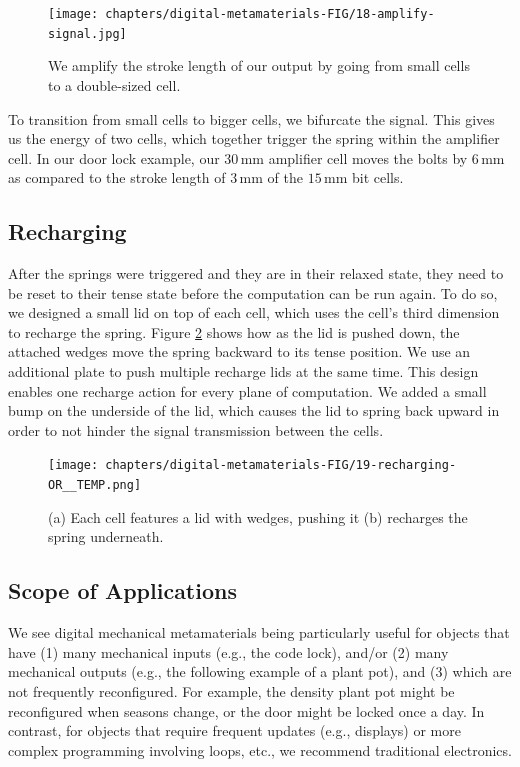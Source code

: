 \begin{figure} [h]  
    \texttt{[image: chapters/digital-metamaterials-FIG/18-amplify-signal.jpg]}
    \caption[Short figure name.]{We amplify the stroke length of our output by going from small cells to a double-sized cell. 
    \label{fig:18-amplify-signal}}
\end{figure}

To transition from small cells to bigger cells, we bifurcate the signal. This gives us the energy of two cells, which together trigger the spring within the amplifier cell. In our door lock example, our $30\, \mathrm{mm}$ amplifier cell moves the bolts by $6\, \mathrm{mm}$ as compared to the stroke length of $3\, \mathrm{mm}$ of the $15\, \mathrm{mm}$ bit cells.


\subsection{Recharging}

After the springs were triggered and they are in their relaxed state, they need to be reset to their tense state before the computation can be run again. To do so, we designed a small lid on top of each cell, which uses the cell's third dimension to recharge the spring. Figure \ref{fig:19-recharging-OR__TEMP} shows how as the lid is pushed down, the attached wedges move the spring backward to its tense position. We use an additional plate to push multiple recharge lids at the same time. This design enables one recharge action for every plane of computation. We added a small bump on the underside of the lid, which causes the lid to spring back upward in order to not hinder the signal transmission between the cells.

\begin{figure} [h]  
    \texttt{[image: chapters/digital-metamaterials-FIG/19-recharging-OR\_\_TEMP.png]}
    \caption[Short figure name.]{(a) Each cell features a lid with wedges, pushing it (b) recharges the spring underneath.
    \label{fig:19-recharging-OR__TEMP}}
\end{figure}


\subsection{Scope of Applications}

We see digital mechanical metamaterials being particularly useful for objects that have (1) many mechanical inputs (e.g., the code lock), and/or (2) many mechanical outputs (e.g., the following example of a plant pot), and (3) which are not frequently reconfigured. For example, the density plant pot might be reconfigured when seasons change, or the door might be locked once a day. In contrast, for objects that require frequent updates (e.g., displays) or more complex programming involving loops, etc., we recommend traditional electronics. 

